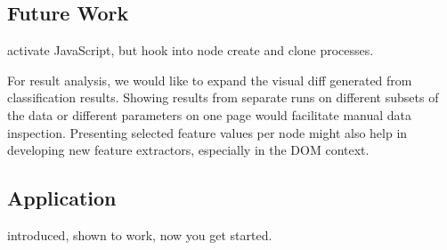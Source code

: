 \subsection{Future Work}


activate JavaScript, but hook into node create and clone processes.

For result analysis, we would like to expand the visual diff generated from classification results.
Showing results from separate runs on different subsets of the data or different parameters on one page would facilitate manual data inspection.
Presenting selected feature values per node might also help in developing new feature extractors, especially in the DOM context.

\subsection{Application}

introduced, shown to work, now you get started.


